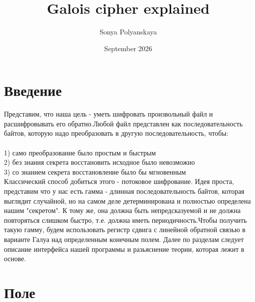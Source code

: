 \documentclass{article}
\title{Galois cipher explained}
\author{Sonya Polyanskaya}
\date{September 2026}
\begin{document}
\maketitle

\section{Введение}
Представим, что наша цель - уметь шифровать произвольный файл и расшифровывать его обратно.Любой файл представлен как последовательность байтов, которую надо преобразовать в другую последовательность, чтобы:
\\
\\
1) само преобразование было простым и быстрым 
\\
2) без знания секрета восстановить исходное было невозможно 
\\
3) со знанием секрета восстановление было бы мгновенным
\\

\noindent
Классический способ добиться этого - потоковое шифрование. Идея проста, представим что у нас есть гамма - длинная последовательность байтов, которая выглядит случайной, но на самом деле детерминирована и полностью определена нашим "секретом". К тому же, она должна быть непредсказуемой и не должна повторяться слишком быстро, т.е. должна иметь периодичность.Чтобы получить такую гамму, будем использовать регистр сдвига с линейной обратной связью в варианте Галуа над определенным конечным полем. Далее по разделам следует описание интерфейса нашей программы и разьяснение теории, которая лежит в основе.
\section{Поле}
\end{document}
